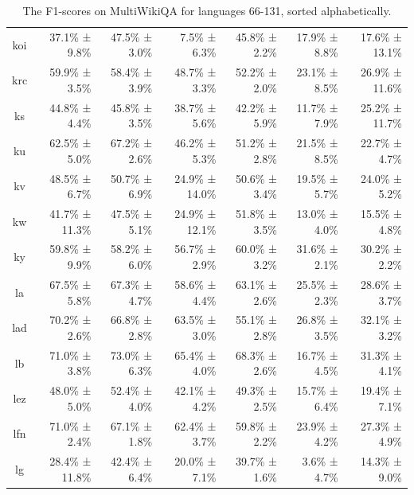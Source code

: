 \documentclass[10pt, a4paper]{article}
\begin{document}
\begin{table}[h]
\begin{tabular}{crrrrrr}
koi & 37.1\% ± 9.8\% & 47.5\% ± 3.0\% & 7.5\% ± 6.3\% & 45.8\% ± 2.2\% & 17.9\% ± 8.8\% & 17.6\% ± 13.1\% \\
krc & 59.9\% ± 3.5\% & 58.4\% ± 3.9\% & 48.7\% ± 3.3\% & 52.2\% ± 2.0\% & 23.1\% ± 8.5\% & 26.9\% ± 11.6\% \\
ks & 44.8\% ± 4.4\% & 45.8\% ± 3.5\% & 38.7\% ± 5.6\% & 42.2\% ± 5.9\% & 11.7\% ± 7.9\% & 25.2\% ± 11.7\% \\
ku & 62.5\% ± 5.0\% & 67.2\% ± 2.6\% & 46.2\% ± 5.3\% & 51.2\% ± 2.8\% & 21.5\% ± 8.5\% & 22.7\% ± 4.7\% \\
kv & 48.5\% ± 6.7\% & 50.7\% ± 6.9\% & 24.9\% ± 14.0\% & 50.6\% ± 3.4\% & 19.5\% ± 5.7\% & 24.0\% ± 5.2\% \\
kw & 41.7\% ± 11.3\% & 47.5\% ± 5.1\% & 24.9\% ± 12.1\% & 51.8\% ± 3.5\% & 13.0\% ± 4.0\% & 15.5\% ± 4.8\% \\
ky & 59.8\% ± 9.9\% & 58.2\% ± 6.0\% & 56.7\% ± 2.9\% & 60.0\% ± 3.2\% & 31.6\% ± 2.1\% & 30.2\% ± 2.2\% \\
la & 67.5\% ± 5.8\% & 67.3\% ± 4.7\% & 58.6\% ± 4.4\% & 63.1\% ± 2.6\% & 25.5\% ± 2.3\% & 28.6\% ± 3.7\% \\
lad & 70.2\% ± 2.6\% & 66.8\% ± 2.8\% & 63.5\% ± 3.0\% & 55.1\% ± 2.8\% & 26.8\% ± 3.5\% & 32.1\% ± 3.2\% \\
lb & 71.0\% ± 3.8\% & 73.0\% ± 6.3\% & 65.4\% ± 4.0\% & 68.3\% ± 2.6\% & 16.7\% ± 4.5\% & 31.3\% ± 4.1\% \\
lez & 48.0\% ± 5.0\% & 52.4\% ± 4.0\% & 42.1\% ± 4.2\% & 49.3\% ± 2.5\% & 15.7\% ± 6.4\% & 19.4\% ± 7.1\% \\
lfn & 71.0\% ± 2.4\% & 67.1\% ± 1.8\% & 62.4\% ± 3.7\% & 59.8\% ± 2.2\% & 23.9\% ± 4.2\% & 27.3\% ± 4.9\% \\
lg & 28.4\% ± 11.8\% & 42.4\% ± 6.4\% & 20.0\% ± 7.1\% & 39.7\% ± 1.6\% & 3.6\% ± 4.7\% & 14.3\% ± 9.0\% \\
\hline
\end{tabular}
\caption{The F1-scores on MultiWikiQA for languages 66-131, sorted alphabetically.}
\label{tab:num-samples-in-small-subsets}
\end{table}
\end{document}
